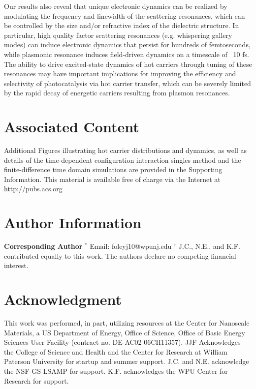 \documentclass[journal=jpclcd,manuscript=article]{achemso}
\begin{document}
Our results also reveal that 
unique electronic dynamics can be realized by modulating the frequency and linewidth of the scattering resonances, which 
can be controlled by the size and/or refractive index of the dielectric structure.  In particular, high quality 
factor scattering resonances (e.g. whispering gallery modes) can induce electronic dynamics that persist for hundreds of 
femtoseconds, while plasmonic resonance induces field-driven dynamics on a timescale of ~10 fs.  The ability to 
drive excited-state dynamics of hot carriers through tuning of these resonances may have important implications 
for improving the efficiency and selectivity of photocatalysis via hot carrier transfer, which can be 
severely limited by the rapid decay of energetic carriers resulting from plasmon resonances.

\section{Associated Content}
Additional Figures illustrating hot carrier distributions and dynamics, as well as details of the time-dependent
configuration interaction singles method and the finite-difference time domain simulations are provided in the Supporting 
Information.  This material is available free of charge via the Internet at http://pubs.acs.org

\section{Author Information}
{\bf Corresponding Author}
$^*$ Email: foleyj10@wpunj.edu
\newline
$^{\dagger}$  J.C., N.E., and K.F. contributed equally to this work.
\newline
The authors declare no competing financial interest.

\section{Acknowledgment}
This work was performed, in part, utilizing resources at
the Center for Nanoscale Materials, a US Department of Energy, Office of Science, Office of
Basic Energy Sciences User Facility (contract no. DE-AC02-06CH11357).
JJF Acknowledges the College of Science and Health and the Center for Research at William Paterson University
for startup and summer support.  J.C. and N.E. acknowledge the NSF-GS-LSAMP for 
support.  K.F. acknowledges the WPU Center for Research for support.


 
\end{document}

